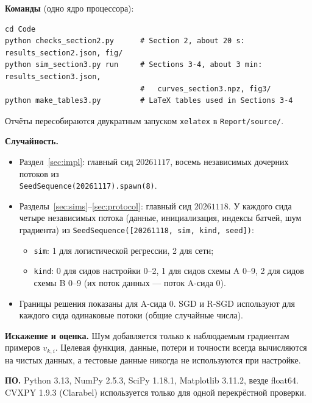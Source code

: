 \documentclass[11pt,a4paper]{article}
\begin{document}
\textbf{Команды} (одно ядро процессора):
\begin{lstlisting}
cd Code
python checks_section2.py      # Section 2, about 20 s: results_section2.json, fig/
python sim_section3.py run     # Sections 3-4, about 3 min: results_section3.json,
                               #   curves_section3.npz, fig3/
python make_tables3.py         # LaTeX tables used in Sections 3-4
\end{lstlisting}
Отчёты пересобираются двукратным запуском \texttt{xelatex} в \texttt{Report/source/}.

\textbf{Случайность.}
\begin{itemize}
\item Раздел~\ref{sec:impl}: главный сид $20261117$, восемь независимых дочерних потоков
из\\ \texttt{SeedSequence(20261117).spawn(8)}.
\item Разделы~\ref{sec:sims}--\ref{sec:protocol}: главный сид $20261118$. У каждого сида четыре
независимых потока (данные, инициализация, индексы батчей, шум градиента) из
\texttt{SeedSequence([20261118, sim, kind, seed])}:
  \begin{itemize}
  \item \texttt{sim}: 1 для логистической регрессии, 2 для сети;
  \item \texttt{kind}: 0 для сидов настройки 0--2, 1 для сидов схемы A 0--9, 2 для сидов схемы B
  0--9 (их поток данных — поток A-сида 0).
  \end{itemize}
\item Границы решения показаны для A-сида 0. SGD и R-SGD используют для каждого сида одинаковые
потоки (общие случайные числа).
\end{itemize}

\textbf{Искажение и оценка.} Шум добавляется только к наблюдаемым градиентам примеров $v_{k,i}$.
Целевая функция, данные, потери и точности всегда вычисляются на чистых данных, а тестовые данные
никогда не используются при настройке.

\textbf{ПО.} Python 3.13, NumPy 2.5.3, SciPy 1.18.1, Matplotlib 3.11.2, везде float64.
CVXPY 1.9.3 (Clarabel) используется только для одной перекрёстной проверки.
\end{document}
